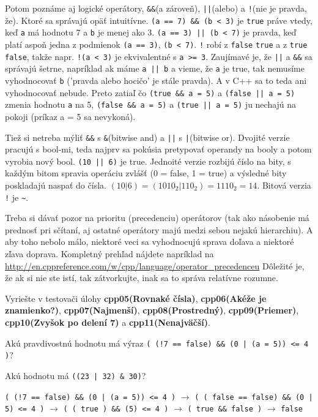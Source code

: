 Potom poznáme aj logické operátory, \verb!&&!(a zároveň), \verb!||!(alebo) a
\verb'!'(nie je pravda, že). Ktoré sa správajú opäť intuitívne.  
\verb!(a == 7) && (b < 3)! je \verb!true! práve vtedy, keď \verb!a! má hodnotu 7 a
\verb!b! je menej ako 3. \verb!(a == 3) || (b < 7)! je pravda, keď platí aspoň jedna
z podmienok \verb!(a == 3)!, \verb!(b < 7)!. \verb'!' robí z 
\verb!false! \verb!true! a z \verb!true! \verb!false!, takže napr. \verb'!(a < 3)' je
ekvivalentné s \verb'a >= 3'.  Zaujímavé je, že \verb!||! a \verb!&&! sa
správajú šetrne, napríklad ak máme \verb!a || b! a vieme, že \verb!a! je true, tak
nemusíme vyhodnocovať \verb!b! ('pravda alebo hocičo' je stále pravda). A v C++ sa
to teda ani vyhodnocovať nebude.  Preto zatiaľ čo \verb!(true && a = 5)! a
\verb!(false || a = 5)!  zmenia hodnotu \verb!a! na 5, \verb!(false && a = 5)! a
\verb!(true || a = 5)! ju nechajú na pokoji (príkaz a = 5 sa nevykoná).

\medskip

Tiež si netreba mýliť \verb!&&! s \verb!&!(bitwise and) a \verb!||! s
\verb!|!(bitwise or). Dvojité verzie pracujú s bool-mi, teda najprv sa pokúsia
pretypovať operandy na booly a potom vyrobia nový bool. \verb!(10 || 6)! je true.
Jednoité verzie rozbijú číslo na bity, s každým bitom spravia operáciu zvlášť
(0 = false, 1 = true) a výsledné bity poskladajú naspať do čísla. 
$(10 | 6) = (1010_2 | 110_2) = 1110_2 = 14$.  Bitová verzia 
\verb'!' je \verb'~'.

Treba si dávať pozor na prioritu (precedenciu) operátorov (tak ako násobenie má
prednosť pri sčítaní, aj ostatné operátory majú medzi sebou nejakú hierarchiu).
A aby toho nebolo málo, niektoré veci sa vyhodnocujú sprava doľava a niektoré
zľava doprava. Kompletný prehľad nájdete napríklad na
\url{http://en.cppreference.com/w/cpp/language/operator\_precedenceu} Dôležité
je, že ak si nie ste istí, tak zátvorkujte, inak sa to správa relatívne
rozumne.

\medskip

Vyriešte v testovači úlohy \textbf{cpp05(Rovnaké čísla)}, \textbf{cpp06(Akéže je znamienko?)}, \textbf{cpp07(Najmenší)},
\textbf{cpp08(Prostredný)}, \textbf{cpp09(Priemer)}, \textbf{cpp10(Zvyšok po delení 7)} a \textbf{cpp11(Nenajväčší)}.

\cvicenie Akú pravdivostnú hodnotu má výraz 
\verb'( (!7 == false) && (0 | (a = 5)) <= 4 )'?

\cvicenie Akú hodnotu má \verb!((23 | 32) & 30)!? 

\riesenie \verb'( (!7 == false) && (0 | (a = 5)) <= 4 )' $\rightarrow$
\verb'( ( false == false) && (0 | 5) <= 4 )' $\rightarrow$
\verb'( ( true ) && (5) <= 4 )' $\rightarrow$ \verb'( true && false )' $\rightarrow$ \verb'false'

